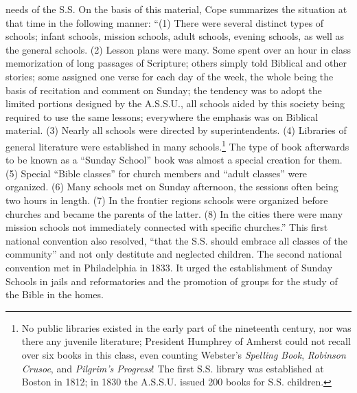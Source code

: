 needs of the S.S. On the basis of this material, Cope summarizes the situation at that time in the following manner: “(1) There were several distinct types of schools; infant schools, mission schools, adult schools, evening schools, as well as the general schools. (2) Lesson plans were many. Some spent over an hour in class memorization of long passages of Scripture; others simply told Biblical and other stories; some assigned one verse for each day of the week, the whole being the basis of recitation and comment on Sunday; the tendency was to adopt the limited portions designed by the A.S.S.U., all schools aided by this society being required to use the same lessons; everywhere the emphasis was on Biblical material. (3) Nearly all schools were directed by superintendents. (4) Libraries of general literature were established in many schools.\footnote{No public libraries existed in the early part of the nineteenth century, nor was there any juvenile literature; President Humphrey of Amherst could not recall over six books in this class, even counting Webster’s \emph{Spelling Book}, \emph{Robinson Crusoe}, and \emph{Pilgrim’s Progress}! The first S.S. library was established at Boston in 1812; in 1830 the A.S.S.U. issued 200 books for S.S. children.} The type of book afterwards to be known as a “Sunday School” book was almost a special creation for them. (5) Special “Bible classes” for church members and “adult classes” were organized. (6) Many schools met on Sunday afternoon, the sessions often being two hours in length. (7) In the frontier regions schools were organized before churches and became the parents of the latter. (8) In the cities there were many mission schools not immediately connected with specific churches.” This first national convention also resolved, “that the S.S. should embrace all classes of the community” and not only destitute and neglected children. The second national convention met in Philadelphia in 1833. It urged the establishment of Sunday Schools in jails and reformatories and the promotion of groups for the study of the Bible in the homes.
